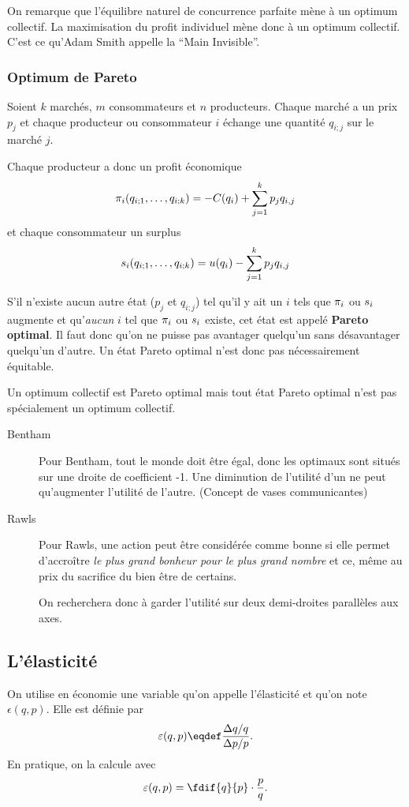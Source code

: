 On remarque que l'équilibre naturel de concurrence parfaite mène à
un optimum collectif.
La maximisation du profit individuel mène donc à un optimum collectif.
C'est ce qu'Adam Smith appelle la ``Main Invisible''.

\subsubsection{Optimum de Pareto}
Soient $k$ marchés, $m$ consommateurs et $n$ producteurs.
Chaque marché a un prix $p_j$ et chaque producteur ou consommateur $i$
échange une quantité $q_{i;j}$ sur le marché $j$.

Chaque producteur a donc un profit économique
\[ \pi_i(q_{i;1},\ldots,q_{i;k}) = -C(q_i) + \sum_{j=1}^k p_jq_{i,j} \]
et chaque consommateur un surplus
\[ s_i(q_{i;1},\ldots,q_{i;k}) = u(q_i) - \sum_{j=1}^k p_jq_{i,j} \]

S'il n'existe aucun autre état ($p_j$ et $q_{i;j}$)
tel qu'il y ait un $i$ tels que $\pi_i$ ou $s_i$ augmente et
qu'\emph{aucun} $i$ tel que $\pi_i$ ou $s_i$ existe,
cet état est appelé \textbf{Pareto optimal}.
Il faut donc qu'on ne puisse pas avantager quelqu'un sans désavantager
quelqu'un d'autre.
Un état Pareto optimal n'est donc pas nécessairement équitable.

Un optimum collectif est Pareto optimal mais tout état Pareto optimal
n'est pas spécialement un optimum collectif.


\begin{description}
  \item[Bentham]
	Pour Bentham, tout le monde doit être égal, donc les optimaux sont
	situés sur une droite de coefficient -1. Une diminution de l'utilité d'un ne
	peut qu'augmenter l'utilité de l'autre. (Concept de vases communicantes)    
  \item[Rawls]
	Pour Rawls, une action peut être considérée comme bonne si elle 
	permet d’accroître \emph{le plus grand bonheur pour le plus
	grand nombre} et ce, même au prix du sacrifice du bien être de certains.
	
	On recherchera donc à garder l'utilité sur deux demi-droites parallèles
	aux axes.
\end{description}


\subsection{L'élasticité}
On utilise en économie une variable qu'on appelle l'élasticité et qu'on note
$\epsilon(q,p)$. Elle est définie par
\begin{equation}
  \label{eq:elasticity}
  \elasticity(q,p) \eqdef \frac{\Delta q/q}{\Delta p/p}.
\end{equation}
En pratique, on la calcule avec
\[ \elasticity(q,p) = \fdif{q}{p}\cdot \frac{p}{q}. \]

